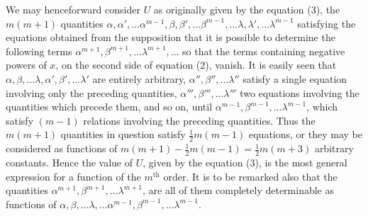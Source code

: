 \documentclass[11pt]{article}
\begin{document}
We may henceforward consider $U$ as originally given by the equation (3), the $m(m+1)$ quantities $\alpha, \alpha', \ldots \alpha^{m-1}, \beta, \beta', \ldots \beta^{m-1}, \ldots \lambda, \lambda', \ldots \lambda^{m-1}$ satisfying the equations obtained from the supposition that it is possible to determine the following terms $\alpha^{m+1}, \beta^{m+1}, \ldots \lambda^{m+1}, \ldots$ so that the terms containing negative powers of $x$, on the second side of equation (2), vanish. It is easily seen that $\alpha, \beta, \ldots \lambda, \alpha', \beta', \ldots \lambda'$ are entirely arbitrary, $\alpha'', \beta'', \ldots \lambda''$ satisfy a single equation involving only the preceding quantities, $\alpha''', \beta''', \ldots \lambda'''$ two equations involving the quantities which precede them, and so on, until $\alpha^{m-1}, \beta^{m-1}, \ldots \lambda^{m-1}$, which satisfy $(m - 1)$ relations involving the preceding quantities. Thus the $m(m+1)$ quantities in question satisfy $\tfrac12 m(m-1)$ equations, or they may be considered as functions of $m(m+1) - \tfrac12 m(m-1) = \tfrac12 m(m+3)$ arbitrary constants. Hence the value of $U$, given by the equation (3), is the most general expression for a function of the $m^{\text{th}}$ order. It is to be remarked also that the quantities $\alpha^{m+1}, \beta^{m+1}, \ldots \lambda^{m+1}$, are all of them completely determinable as functions of $\alpha, \beta, \ldots \lambda, \ldots \alpha^{m-1}, \beta^{m-1}, \ldots \lambda^{m-1}$.
\end{document}

